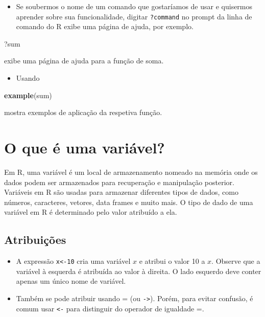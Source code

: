 \documentclass[
]{book}
\newenvironment{Shaded}{\begin{snugshade}}{\end{snugshade}}
\newcommand{\FunctionTok}[1]{\textcolor[rgb]{0.13,0.29,0.53}{\textbf{#1}}}
\newcommand{\NormalTok}[1]{#1}
\providecommand{\tightlist}{%
  \setlength{\itemsep}{0pt}\setlength{\parskip}{0pt}}
\theoremstyle{definition}
\theoremstyle{definition}
\theoremstyle{definition}
\theoremstyle{definition}
\theoremstyle{remark}
\begin{document}
\begin{itemize}
\tightlist
\item
  Se soubermos o nome de um comando que gostaríamos de usar e quisermos aprender sobre sua funcionalidade, digitar \texttt{?command} no prompt da linha de comando do R exibe uma página de ajuda, por exemplo.
\end{itemize}

\begin{Shaded}
\begin{Highlighting}[]
\NormalTok{?sum}
\end{Highlighting}
\end{Shaded}

exibe uma página de ajuda para a função de soma.

\begin{itemize}
\tightlist
\item
  Usando
\end{itemize}

\begin{Shaded}
\begin{Highlighting}[]
\FunctionTok{example}\NormalTok{(sum)}
\end{Highlighting}
\end{Shaded}

mostra exemplos de aplicação da respetiva função.

\section{O que é uma variável?}\label{o-que-uxe9-uma-variuxe1vel}

Em R, uma variável é um local de armazenamento nomeado na memória onde os dados podem ser armazenados para recuperação e manipulação posterior. Variáveis em R são usadas para armazenar diferentes tipos de dados, como números, caracteres, vetores, data frames e muito mais. O tipo de dado de uma variável em R é determinado pelo valor atribuído a ela.

\subsection{Atribuições}\label{atribuiuxe7uxf5es}

\begin{itemize}
\item
  A expressão \texttt{x\textless{}-10} cria uma variável \(x\) e atribui o valor 10 a \(x\). Observe que a variável à esquerda é atribuída ao valor à direita. O lado esquerdo deve conter apenas um único nome de variável.
\item
  Também se pode atribuir usando = (ou \texttt{-\textgreater{}}). Porém, para evitar confusão, é comum usar \texttt{\textless{}-} para distinguir do operador de igualdade =.
\end{itemize}
\end{document}
